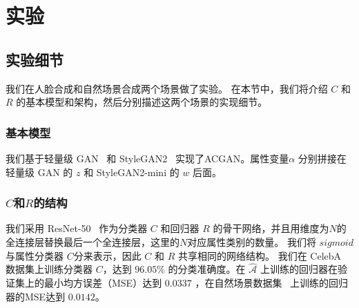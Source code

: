 \section{实验}

\subsection{实验细节}
我们在人脸合成和自然场景合成两个场景做了实验。 在本节中，我们将介绍 $C$ 和 $R$ 的基本模型和架构，然后分别描述这两个场景的实现细节。

\subsubsection{基本模型} 
我们基于轻量级 GAN~\cite{lwgan} 和 StyleGAN2~\cite{stylegan2} 实现了ACGAN。属性变量$\alpha$ 分别拼接在 轻量级 GAN 的 $z$ 和 StyleGAN2-mini 的 $w$ 后面。

\subsubsection{$C$和$R$的结构}
我们采用 ResNet-50~\cite{resnet} 作为分类器 $C$ 和回归器 $R$ 的骨干网络，并且用维度为$N$的全连接层替换最后一个全连接层，这里的$N$对应属性类别的数量。 我们将 $sigmoid$ 与属性分类器 $C$分来表示，因此 $C$ 和 $R$ 共享相同的网络结构。 我们在 CelebA 数据集上训练分类器 $C$，达到 $96.05\%$ 的分类准确度。在 $\hat{\mathcal{A}}$ 上训练的回归器在验证集上的最小均方误差（MSE）达到 $0.0337$ ，在自然场景数据集~\cite{scenedataset} 上训练的回归器的MSE达到 $0.0142$。

